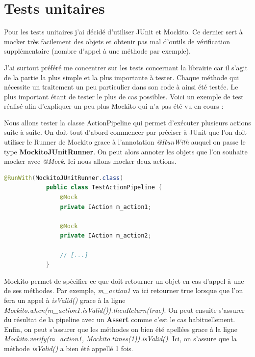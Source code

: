 \documentclass[report]{BetterDocument}
\begin{document}
	\section{Tests unitaires}

		Pour les tests unitaires j'ai décidé d'utiliser JUnit et Mockito. Ce dernier sert à mocker très facilement des objets et obtenir pas mal d'outils de vérification supplémentaire (nombre d'appel à une méthode par exemple).

		J'ai surtout préféré me concentrer sur les tests concernant la librairie car il s'agit de la partie la plus simple et la plus importante à tester. Chaque méthode qui nécessite un traitement un peu particulier dans son code à ainsi été testée. Le plus important étant de tester le plus de cas possibles. Voici un exemple de test réalisé afin d'expliquer un peu plus Mockito qui n'a pas été vu en cours :

		Nous allons tester la classe ActionPipeline qui permet d'exécuter plusieurs actions suite à suite. On doit tout d'abord commencer par préciser à JUnit que l'on doit utiliser le Runner de Mockito grace à l'annotation \textit{@RunWith} auquel on passe le type \textbf{MockitoJUnitRunner}. On peut alors annoter les objets que l'on souhaite mocker avec \textit{@Mock}. Ici nous allons mocker deux actions.

		\begin{lstlisting}[gobble=12, language=Java, caption=Exemple de mock avec mockito]
			@RunWith(MockitoJUnitRunner.class)
			public class TestActionPipeline {
				@Mock
				private IAction m_action1;

				@Mock
				private IAction m_action2;

				// [...]
			}
		\end{lstlisting}

		Mockito permet de spécifier ce que doit retourner un objet en cas d'appel à une de ses méthodes. Par exemple, \textit{m\_action1} va ici retourner true lorsque que l'on fera un appel à \textit{isValid()} grace à la ligne\\ \textit{Mockito.when(m\_action1.isValid()).thenReturn(true)}. On peut ensuite s'assurer du résultat de la pipeline avec un \textbf{Assert} comme c'est le cas habituellement. Enfin, on peut s'assurer que les méthodes on bien été apellées grace à la ligne \textit{Mockito.verify(m\_action1, Mockito.times(1)).isValid()}. Ici, on s'assure que la méthode \textit{isValid()} a bien été appellé 1 fois.
\end{document}

